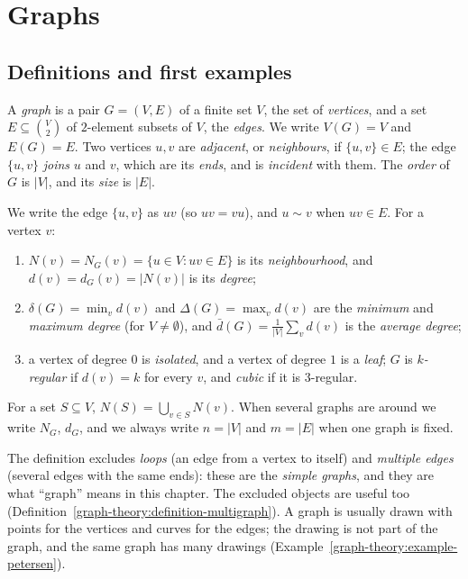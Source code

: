 \section{Graphs}\label{graph-theory:section-graphs}

\subsection{Definitions and first examples}\label{graph-theory:subsection-definitions}

\begin{definition}\label{graph-theory:definition-graph}
A \emph{graph} is a pair $G = (V, E)$ of a finite set $V$, the set of \emph{vertices}, and a set $E \subseteq \binom{V}{2}$ of $2$-element subsets of $V$, the \emph{edges}. We write $V(G) = V$ and
$E(G) = E$. Two vertices $u, v$ are \emph{adjacent}, or \emph{neighbours}, if $\{u, v\} \in E$; the edge $\{u, v\}$ \emph{joins} $u$ and $v$, which are its \emph{ends}, and is \emph{incident}
with them. The \emph{order} of $G$ is $|V|$, and its \emph{size} is $|E|$.
\end{definition}

\begin{notation}\label{graph-theory:notation-graphs}
We write the edge $\{u, v\}$ as $uv$ (so $uv = vu$), and $u \sim v$ when $uv \in E$. For a vertex $v$:
\begin{enumerate}
\item $N(v) = N_G(v) = \{u \in V : uv \in E\}$ is its \emph{neighbourhood}, and $d(v) = d_G(v) = |N(v)|$ is its \emph{degree};
\item $\delta(G) = \min_vd(v)$ and $\Delta(G) = \max_vd(v)$ are the \emph{minimum} and \emph{maximum degree} (for $V \neq \emptyset$), and $\bar{d}(G) = \frac{1}{|V|}\sum_vd(v)$ is the
\emph{average degree};
\item a vertex of degree $0$ is \emph{isolated}, and a vertex of degree $1$ is a \emph{leaf}; $G$ is \emph{$k$-regular} if $d(v) = k$ for every $v$, and \emph{cubic} if it is $3$-regular.
\end{enumerate}
For a set $S \subseteq V$, $N(S) = \bigcup_{v \in S}N(v)$. When several graphs are around we write $N_G$, $d_G$, and we always write $n = |V|$ and $m = |E|$ when one graph is fixed.
\end{notation}

The definition excludes \emph{loops} (an edge from a vertex to itself) and \emph{multiple edges} (several edges with the same ends): these are the \emph{simple graphs}, and they are what
``graph'' means in this chapter. The excluded objects are useful too (Definition~\ref{graph-theory:definition-multigraph}). A graph is usually drawn with points for the vertices and curves
for the edges; the drawing is not part of the graph, and the same graph has many drawings (Example~\ref{graph-theory:example-petersen}).

